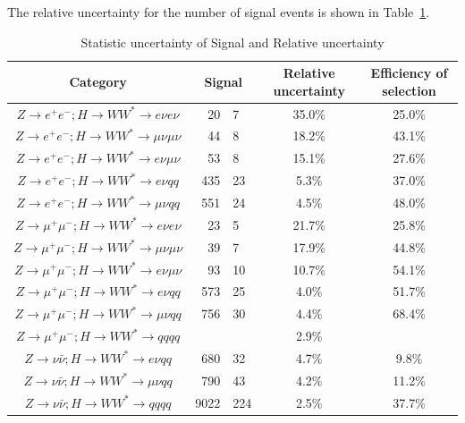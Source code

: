 \documentclass[11pt,a4paper]{cepcnote}
\begin{document}
The relative uncertainty for the number of signal events is shown in Table~\ref{tab:fullstatistic}. 
\begin{table}[H]
  \begin{center}
    \begin{tabular}{cr@{$\pm$}lcc}
      \hline \hline
      Category&\multicolumn{2}{c}{Signal}&\multicolumn{1}{c}{Relative uncertainty}&\multicolumn{1}{c}{Efficiency of selection}\\ 
      \hline
      $Z\rightarrow e^+e^-; H\rightarrow WW^*\rightarrow e\nu e\nu			$	&20    &7	&35.0\% &25.0\%\\
      $Z\rightarrow e^+e^-; H\rightarrow WW^*\rightarrow \mu\nu\mu\nu		$	&44    &8	&18.2\%	&43.1\%\\ 
      $Z\rightarrow e^+e^-; H\rightarrow WW^*\rightarrow e\nu\mu\nu			$	&53    &8	&15.1\% &27.6\%\\
	  $Z\rightarrow e^+e^-; H\rightarrow WW^*\rightarrow e\nu qq			$	&435   &23  &5.3\%  &37.0\%\\
	  $Z\rightarrow e^+e^-; H\rightarrow WW^*\rightarrow \mu\nu qq			$	&551   &24	&4.5\%  &48.0\%\\
      $Z\rightarrow \mu^+\mu^-; H\rightarrow WW^*\rightarrow e\nu e\nu		$	&23    &5	&21.7\% &25.8\%\\
      $Z\rightarrow \mu^+\mu^-; H\rightarrow WW^*\rightarrow \mu\nu\mu\nu	$	&39    &7	&17.9\%	&44.8\%\\ 
      $Z\rightarrow \mu^+\mu^-; H\rightarrow WW^*\rightarrow e\nu\mu\nu		$	&93    &10	&10.7\% &54.1\%\\
	  $Z\rightarrow \mu^+\mu^-; H\rightarrow WW^*\rightarrow e\nu qq		$	&573   &25  &4.0\%  &51.7\%\\
	  $Z\rightarrow \mu^+\mu^-; H\rightarrow WW^*\rightarrow \mu\nu qq		$	&756   &30	&4.4\%  &68.4\%\\
	  $Z\rightarrow \mu^+\mu^-; H\rightarrow WW^*\rightarrow qqqq			$	&   	&	&2.9\%  &\\
	  $Z\to \nu\bar{\nu}; H\to WW^* \to e \nu qq							$	&680   &32	&4.7\%	&9.8\%\\
	  $Z\to \nu\bar{\nu}; H\to WW^* \to \mu\nu qq							$	&790   &43	&4.2\%	&11.2\%\\
	  $Z\rightarrow \nu\bar{\nu}; H\rightarrow WW^*\rightarrow qqqq			$	&9022  &224	&2.5\%  &37.7\%\\
      \hline \hline
    \end{tabular}
  \caption{Statistic uncertainty of Signal and Relative uncertainty}
  \label{tab:fullstatistic}
  \end{center}
\end{table}
\end{document}
